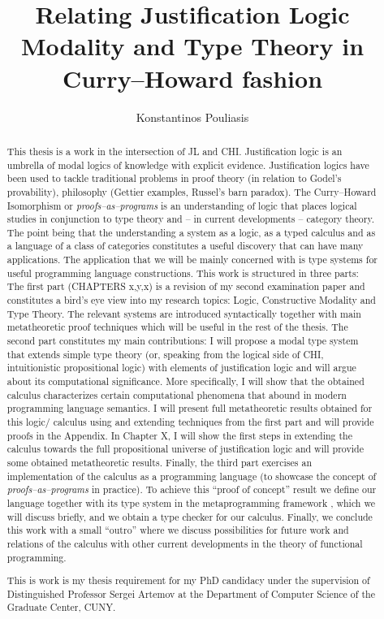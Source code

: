 \documentclass[12pt]{report}
\title{Relating Justification Logic Modality and Type Theory in Curry--Howard fashion}
\author{Konstantinos Pouliasis}
\begin{document}
\maketitle


\begin{abstract}
This thesis is a work in the intersection of \ac{JL} and \ac{CHI}. Justification logic is an umbrella of modal logics of knowledge with explicit evidence. 
Justification logics have been used to tackle traditional problems in proof theory (in relation to Godel's provability), philosophy (Gettier examples, Russel's barn paradox). 
The Curry--Howard Isomorphism or \emph{proofs--as--programs} is an understanding of logic that places logical studies in conjunction to type theory and -- in current developments -- 
category theory. The point being that the  understanding a system as a logic, as a typed calculus and as a language of a class of categories constitutes a useful discovery 
that can have many applications.
The application that we will be mainly concerned with is type systems for useful programming language constructions. 
This work  is structured in three parts: 
The first part (CHAPTERS x,y,x) is a revision of my second examination paper and constitutes a bird's eye view into my research topics:  
Logic, Constructive Modality and Type Theory. 
The relevant systems are introduced syntactically together with main  metatheoretic proof techniques which will be useful in the rest of the thesis.
The second part constitutes my main contributions: I will propose  a modal type system that extends simple type theory (or, speaking from the logical side of \ac{CHI}, 
intuitionistic propositional logic) with elements of justification logic and will argue about its computational significance. More specifically, I will show  
that the obtained calculus characterizes  certain computational phenomena that abound in modern programming language semantics. 
I will present full metatheoretic
results obtained for this logic/ calculus using and extending techniques from the first part and will provide proofs in the Appendix. 
In Chapter X, 
I will show the first steps in extending the calculus towards the full propositional universe of justification logic and will provide some obtained metatheoretic results.
Finally, the third part exercises an implementation of the calculus as a programming language (to showcase the concept of \emph{proofs--as--programs} in practice). To achieve this ``proof of concept'' result we define our 
language together with its type system
in the metaprogramming framework , which we will discuss briefly, 
and we obtain a type checker for our calculus. Finally, we conclude this work with a small ``outro'' 
where we discuss possibilities for future work and relations of the calculus with other current developments in the theory 
of functional programming.

This is work is my thesis requirement for my PhD candidacy under the supervision of Distinguished Professor Sergei Artemov at the Department of 
Computer Science of the Graduate Center, CUNY.
\end{abstract}
\end{document}
